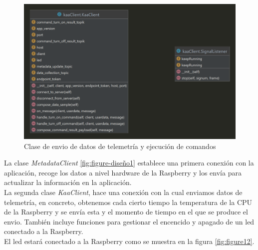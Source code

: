 \begin{figure}[p]
    \centering
    \includegraphics[width=\linewidth]{imagenes/kaaClient.png}
    \caption{Clase de envio de datos de telemetría y ejecución de comandos}
    \label{fig:figure-diseño2}
\end{figure}

La clase \textit{MetadataClient} \ref{fig:figure-diseño1} establece una primera conexión con la aplicación, recoge los datos a nivel hardware de la Raspberry y los envía para actualizar la información en la aplicación. \\

La segunda clase \textit{KaaClient}, hace una conexión con la cual enviamos datos de telemetría, en concreto, obtenemos cada cierto tiempo la temperatura de la CPU de la Raspberry y se envía esta y el momento de tiempo en el que se produce el envio. También incluye funciones para gestionar el encencido y apagado de un led conectado a la Raspberry. \\

El led estará conectado a la Raspberry como se muestra en la figura \ref{fig:figure12}.

